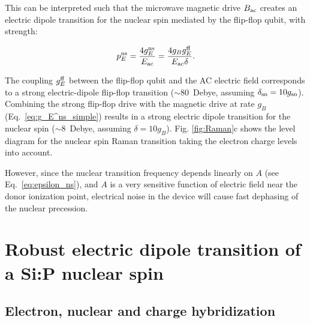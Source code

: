 This can be interpreted such that the microwave magnetic drive $B_{\rm ac}$ creates an electric dipole transition for the nuclear spin mediated by the flip-flop qubit, with strength:

\begin{equation}
p_E^{\rm ns} = \frac{4 g_E^{\rm ns}}{E_{\rm ac}} = \frac{4 g_B g_{E}^{\rm ff}}{E_{\rm ac} \delta}.
\label{eq:pns}
\end{equation}

The coupling $g_{E}^{\rm ff}$ between the flip-flop qubit and the AC electric field corresponds to a strong electric-dipole flip-flop transition ($\sim80$~Debye, assuming $\delta_{\rm so}=10g_{\rm so}$). Combining the strong flip-flop drive with the magnetic drive at rate $g_B$ (Eq.~\ref{eq:g_E^ns_simple}) results in a strong electric dipole transition for the nuclear spin ($\sim8$~Debye, assuming $\delta=10g_B$). Fig. \ref{fig:Raman}c shows the level diagram for the nuclear spin Raman transition taking the electron charge levels into account.

However, since the nuclear transition frequency depends linearly on $A$ (see Eq.~\ref{eq:epsilon_ns}), and $A$ is a very sensitive function of electric field near the donor ionization point, electrical noise in the device will cause fast dephasing of the nuclear precession.


\section{Robust electric dipole transition of a Si:P nuclear spin} \label{sec:robust}

\subsection{Electron, nuclear and charge hybridization} \label{sec:nuchybrid}

